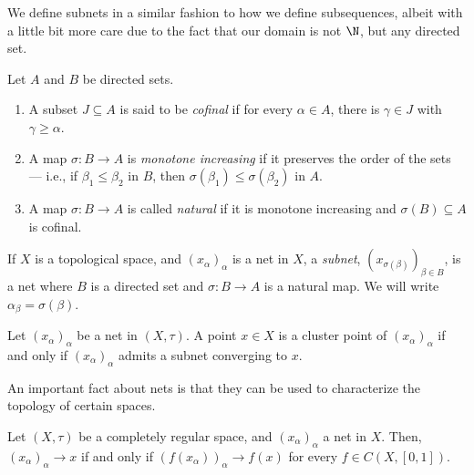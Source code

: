 We define subnets in a similar fashion to how we define subsequences, albeit with a little bit more care due to the fact that our domain is not $\N$, but any directed set.
\begin{definition}
  Let $A$ and $B$ be directed sets.
  \begin{enumerate}[(1)]
    \item A subset $J\subseteq A$ is said to be \textit{cofinal} if for every $\alpha \in A$, there is $\gamma\in J$ with $\gamma \geq \alpha$.
    \item A map $\sigma\colon B\rightarrow A$ is \textit{monotone increasing} if it preserves the order of the sets --- i.e., if $\beta_1\leq \beta_2$ in $B$, then $\sigma\left(\beta_1\right) \leq \sigma\left(\beta_2\right)$ in $A$.
    \item A map $\sigma\colon B\rightarrow A$ is called \textit{natural} if it is monotone increasing and $\sigma\left(B\right)\subseteq A$ is cofinal.
  \end{enumerate}
  If $X$ is a topological space, and $\left(x_{\alpha}\right)_{\alpha}$ is a net in $X$, a \textit{subnet}, $\left(x_{\sigma\left(\beta\right)}\right)_{\beta\in B}$, is a net where $B$ is a directed set and $\sigma\colon B\rightarrow A$ is a natural map. We will write $\alpha_{\beta} = \sigma\left(\beta\right)$.
\end{definition}
\begin{fact}
  Let $\left(x_{\alpha}\right)_{\alpha}$ be a net in $\left(X,\tau\right)$. A point $x\in X$ is a cluster point of $\left(x_{\alpha}\right)_{\alpha}$ if and only if $\left(x_{\alpha}\right)_{\alpha}$ admits a subnet converging to $x$.
\end{fact}
An important fact about nets is that they can be used to characterize the topology of certain spaces.
\begin{fact}
  Let $\left(X,\tau\right)$ be a completely regular space, and $\left(x_{\alpha}\right)_{\alpha}$ a net in $X$. Then, $\left(x_{\alpha}\right)_{\alpha}\rightarrow x$ if and only if $\left(f\left(x_{\alpha}\right)\right)_{\alpha}\rightarrow f(x)$ for every $f\in C\left(X,\left[0,1\right]\right)$.
\end{fact}
